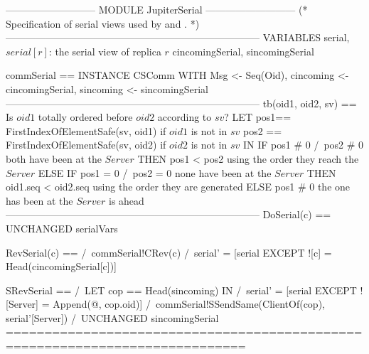 \documentclass{article}
\begin{document}
\begin{tla}
--------------------------- MODULE JupiterSerial ---------------------------
(*
Specification of serial views used by \absjupiter{} and \cjupiter{}.
*)
-----------------------------------------------------------------------------
VARIABLES
    serial, \* $serial[r]$: the serial view of replica $r$
    cincomingSerial, sincomingSerial

commSerial == INSTANCE CSComm WITH Msg <- Seq(Oid), 
                cincoming <- cincomingSerial, sincoming <- sincomingSerial
-----------------------------------------------------------------------------
tb(oid1, oid2, sv) == \* Is $oid1$ totally ordered before $oid2$ according to $sv$?
    LET  pos1== FirstIndexOfElementSafe(sv, oid1)  if $oid1$ is not in $sv$
        pos2 == FirstIndexOfElementSafe(sv, oid2)  if $oid2$ is not in $sv$
    IN  IF pos1 # 0 /\ pos2 # 0 \* both have been at the $Server$
        THEN pos1 < pos2        \* using the order they reach the $Server$
        ELSE IF pos1 = 0 /\ pos2 = 0  \* none have been at the $Server$
             THEN oid1.seq < oid2.seq \* using the order they are generated
             ELSE pos1 # 0 \* the one has been at the $Server$ is ahead
-----------------------------------------------------------------------------
DoSerial(c) ==
    UNCHANGED serialVars

RevSerial(c) ==
    /\ commSerial!CRev(c)
    /\ serial' = [serial EXCEPT ![c] = Head(cincomingSerial[c])]

SRevSerial ==
    /\ LET cop == Head(sincoming)
       IN  /\ serial' = [serial EXCEPT ![Server] = Append(@, cop.oid)]
           /\ commSerial!SSendSame(ClientOf(cop), serial'[Server])
    /\ UNCHANGED sincomingSerial
=============================================================================
\end{tla}
\end{document}
